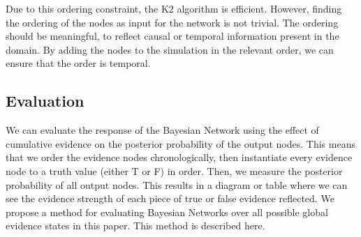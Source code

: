 \documentclass[12pt]{article}
\begin{document}
Due to this ordering constraint, the K2 algorithm is efficient. However, finding the ordering of the nodes as input for the network is not trivial. The ordering should be meaningful, to reflect causal or temporal information present in the domain. By adding the nodes to the simulation in the relevant order, we can ensure that the order is temporal. 



\subsection{Evaluation}

We can evaluate the response of the Bayesian Network using the effect of cumulative evidence on the posterior probability of the output nodes. This means that we order the evidence nodes chronologically, then instantiate every evidence node to a truth value (either T or F) in order. Then, we measure the posterior probability of all output nodes. This results in a diagram or table where we can see the evidence strength of each piece of true or false evidence reflected. We propose a method for evaluating Bayesian Networks over all possible global evidence states in this paper. This method is described here.
\end{document}
